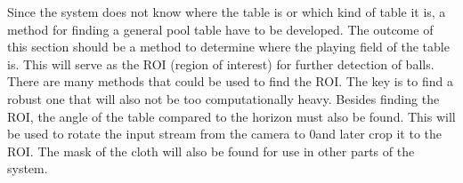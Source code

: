 Since the system does not know where the table is or which kind of table it is, a method for finding a general pool table have to be developed. The outcome of this section should be a method to determine where the playing field of the table is. This will serve as the ROI (region of interest) for further detection of balls. There are many methods that could be used to find the ROI. The key is to find a robust one that will also not be too computationally heavy. Besides finding the ROI, the angle of the table compared to the horizon must also be found. This will be used to rotate the input stream from the camera to 0\degree and later crop it to the ROI. The mask of the cloth will also be found for use in other parts of the system.\\
